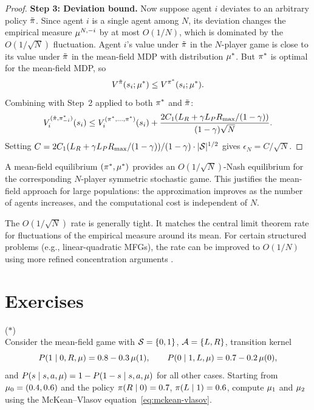 \documentclass[11pt,a4paper]{article}
\begin{document}
\begin{proof}
\textbf{Step 3: Deviation bound.}  Now suppose agent $i$ deviates
to an arbitrary policy $\tilde{\pi}$.  Since agent $i$ is a
single agent among $N$, its deviation changes the empirical measure
$\mu^{N,-i}$ by at most $O(1/N)$, which is dominated by
the $O(1/\sqrt{N})$ fluctuation.  Agent $i$'s value under
$\tilde{\pi}$ in the $N$-player game is close to its value
under $\tilde{\pi}$ in the mean-field MDP with distribution
$\mu^*$.  But $\pi^*$ is optimal for the mean-field MDP,
so
\[
  V^{\tilde{\pi}}(s_i; \mu^*)
  \leq V^{\pi^*}(s_i; \mu^*).
\]
Combining with Step~2 applied to both $\pi^*$ and
$\tilde{\pi}$:
\[
  V_i^{(\tilde{\pi}, \pi_{-i}^*)}(s_i)
  \leq V_i^{(\pi^*, \ldots, \pi^*)}(s_i)
  + \frac{2C_1(L_R + \gamma L_P R_{\max}/(1-\gamma))}
    {(1-\gamma)\sqrt{N}}.
\]
Setting $C = 2C_1(L_R + \gamma L_P R_{\max}/(1-\gamma))
/(1-\gamma) \cdot |\mathcal{S}|^{1/2}$ gives $\epsilon_N = C/\sqrt{N}$.
\end{proof}

\begin{keyresult}[title={Quality of the Mean-Field Approximation}]
A mean-field equilibrium $(\pi^*, \mu^*)$ provides an
$O(1/\sqrt{N})$-Nash equilibrium for the corresponding $N$-player
symmetric stochastic game.  This justifies the mean-field approach
for large populations: the approximation improves as the number of
agents increases, and the computational cost is independent of $N$.
\end{keyresult}

\begin{remark}
\label{rem:rate-tightness}
The $O(1/\sqrt{N})$ rate is generally tight.  It matches the
central limit theorem rate for fluctuations of the empirical
measure around its mean.  For certain structured problems (e.g.,
linear-quadratic MFGs), the rate can be improved to $O(1/N)$
using more refined concentration arguments
\citep[Chapter~5]{carmona2018i}.
\end{remark}


\section{Exercises}
\label{sec:exercises}

\begin{exercise}
\textnormal{(\(*\))} \\
Consider the mean-field game with $\mathcal{S} = \{0,1\}$,
$\mathcal{A} = \{L, R\}$, transition kernel
\[
  P(1 \mid 0, R, \mu) = 0.8 - 0.3\,\mu(1),
  \qquad
  P(0 \mid 1, L, \mu) = 0.7 - 0.2\,\mu(0),
\]
and $P(s \mid s, a, \mu) = 1 - P(1-s \mid s, a, \mu)$
for all other cases.  Starting from $\mu_0 = (0.4, 0.6)$ and
the policy $\pi(R \mid 0) = 0.7$, $\pi(L \mid 1) = 0.6$,
compute $\mu_1$ and $\mu_2$ using the McKean--Vlasov
equation~\eqref{eq:mckean-vlasov}.
\end{exercise}
\end{document}
